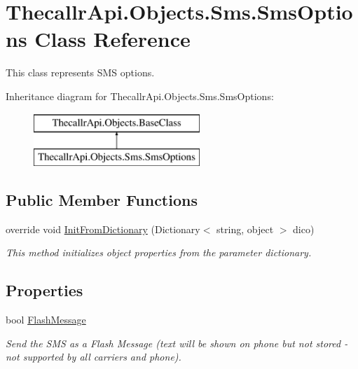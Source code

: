 \hypertarget{class_thecallr_api_1_1_objects_1_1_sms_1_1_sms_options}{\section{Thecallr\+Api.\+Objects.\+Sms.\+Sms\+Options Class Reference}
\label{class_thecallr_api_1_1_objects_1_1_sms_1_1_sms_options}
}


This class represents S\+M\+S options.  


Inheritance diagram for Thecallr\+Api.\+Objects.\+Sms.\+Sms\+Options\+:\begin{figure}[H]
\begin{center}
\leavevmode
\includegraphics[height=2.000000cm]{class_thecallr_api_1_1_objects_1_1_sms_1_1_sms_options}
\end{center}
\end{figure}
\subsection*{Public Member Functions}
\begin{DoxyCompactItemize}
\item 
override void \hyperlink{class_thecallr_api_1_1_objects_1_1_sms_1_1_sms_options_a04da6f8bfa53adc91aaa1a7da20ac187}{Init\+From\+Dictionary} (Dictionary$<$ string, object $>$ dico)
\begin{DoxyCompactList}\small\item\em This method initializes object properties from the parameter dictionary. \end{DoxyCompactList}\end{DoxyCompactItemize}
\subsection*{Properties}
\begin{DoxyCompactItemize}
\item 
bool \hyperlink{class_thecallr_api_1_1_objects_1_1_sms_1_1_sms_options_ad526cb3d8a75a16cfcd39968a51fd0d3}{Flash\+Message}
\begin{DoxyCompactList}\small\item\em Send the S\+M\+S as a Flash Message (text will be shown on phone but not stored -\/ not supported by all carriers and phone). \end{DoxyCompactList}\end{DoxyCompactItemize}


